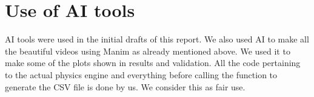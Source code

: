 \section*{Use of AI tools}
AI tools were used in the initial drafts of this report. We also used AI to make all the beautiful videos using Manim as already mentioned above.
We used it to make some of the plots shown in results and validation. All the code pertaining to the actual physics engine and everything before calling the function to generate the CSV file is done by us.
We consider this as fair use.
